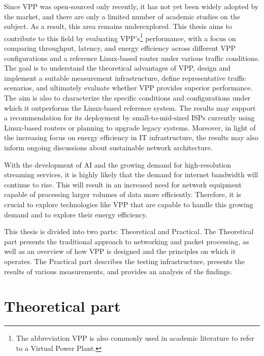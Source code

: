 Since VPP was open-sourced only recently, it has not yet been widely adopted by the market, and there are only a limited number of academic studies on the subject. As a result, this area remains underexplored. 
This thesis aims to contribute to this field by evaluating VPP's\footnote{The abbreviation VPP is also commonly used in academic literature to refer to a Virtual Power Plant.} performance, 
with a focus on comparing throughput, latency, and energy efficiency across different VPP configurations and a reference Linux-based router under various traffic conditions.
The goal is to understand the theoretical advantages of VPP, design and implement a suitable measurement infrastructure, define representative traffic scenarios, 
and ultimately evaluate whether VPP provides superior performance. The aim is also to characterize the specific conditions and configurations under which it outperforms the Linux-based reference system.
The results may support a recommendation for its deployment by small-to-mid-sized ISPs currently using Linux-based routers or planning to upgrade legacy systems.
Moreover, in light of the increasing focus on energy efficiency in IT infrastructure, the results may also inform ongoing discussions about sustainable network architecture.

With the development of AI and the growing demand for high-resolution streaming services, it is highly likely that the demand for internet bandwidth will continue to rise. 
This will result in an increased need for network equipment capable of processing larger volumes of data more efficiently. 
Therefore, it is crucial to explore technologies like VPP that are capable to handle this growing demand and to explore their energy efficiency.

This thesis is divided into two parts: Theoretical and Practical. 
The Theoretical part presents the traditional approach to networking and packet processing, as well as an overview of how VPP is designed and the principles on which it operates. 
The Practical part describes the testing infrastructure, presents the results of various measurements, and provides an analysis of the findings.

\chapter{Theoretical part}

